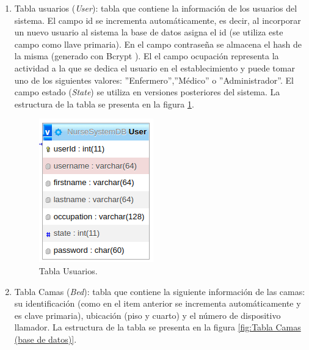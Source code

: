 \begin{enumerate}

\item Tabla usuarios (\textit{User}): tabla que contiene la información de los usuarios del sistema. El campo id se incrementa automáticamente, es decir, al incorporar un nuevo usuario al sistema la base de datos asigna el id (se utiliza este campo como llave primaria). En el campo contraseña se almacena el hash de la misma (generado con Bcrypt \citep{WEBSITE:31}). El el campo ocupación representa la actividad a la que se dedica el usuario en el establecimiento y puede tomar uno de los siguientes valores: ''Enfermero'',''Médico'' o ''Administrador''. El campo estado (\textit{State}) se utiliza en versiones posteriores del sistema. La estructura de la tabla se presenta en la figura \ref{fig:Tabla Usuarios (base de datos)}.

\begin{figure}[ht]
	\centering
	\includegraphics[scale=.65]{./Figures/dB(user).png}
	\caption{Tabla Usuarios.}
	\label{fig:Tabla Usuarios (base de datos)}
\end{figure}

\item Tabla Camas (\textit{Bed}): tabla que contiene la siguiente información de las camas: su identificación (como en el item anterior se incrementa automáticamente y es clave primaria), ubicación (piso y cuarto) y el número de dispositivo llamador. La estructura de la tabla se presenta en la figura \ref{fig:Tabla Camas (base de datos)}.


\end{enumerate}

